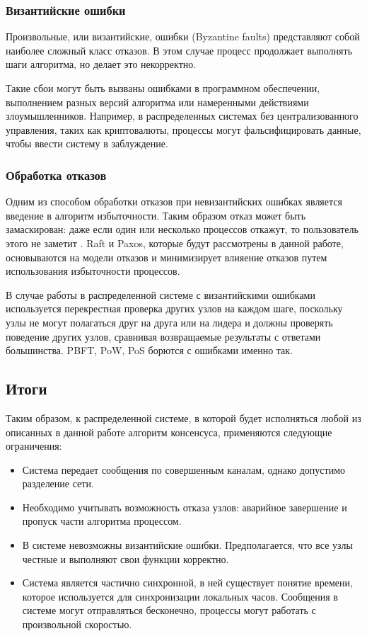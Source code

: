 \subsubsection*{Византийские ошибки}

Произвольные, или византийские, ошибки (Byzantine faults) представляют собой
наиболее сложный класс отказов. В этом случае процесс продолжает выполнять шаги
алгоритма, но делает это некорректно.

Такие сбои могут быть вызваны ошибками в программном обеспечении, выполнением
разных версий алгоритма или намеренными действиями злоумышленников. Например,
в распределенных системах без централизованного управления, таких как
криптовалюты, процессы могут фальсифицировать данные, чтобы ввести систему в
заблуждение.

\subsubsection*{Обработка отказов}

Одним из способом обработки отказов при невизантийских ошибках является введение
в алгоритм избыточности. Таким образом отказ может быть замаскирован: даже если
один или несколько процессов откажут, то пользователь этого не заметит
\cite{christian91}. Raft и Paxos, которые будут рассмотрены в данной работе,
основываются на модели отказов и минимизирует влияение отказов путем
использования избыточности процессов.

В случае работы в распределенной системе с византийскими ошибками используется
перекрестная проверка других узлов на каждом шаге, поскольку узлы не могут
полагаться друг на друга или на лидера и должны проверять поведение других узлов,
сравнивая возвращаемые результаты с ответами большинства. PBFT, PoW, PoS борются
с ошибками именно так.

\subsection{Итоги}

Таким образом, к распределенной системе, в которой будет исполняться любой из
описанных в данной работе алгоритм консенсуса, применяются следующие ограничения:

\begin{itemize}
    \item Система передает сообщения по совершенным каналам, однако допустимо
        разделение сети.
    \item Необходимо учитывать возможность отказа узлов: аварийное завершение и
        пропуск части алгоритма процессом.
    \item В системе невозможны византийские ошибки. Предполагается, что все узлы
        честные и выполняют свои функции корректно.
    \item Система является частично синхронной, в ней существует понятие времени,
        которое используется для синхронизации локальных часов. Сообщения в системе
        могут отправляться бесконечно, процессы могут работать с произвольной
        скоростью.
\end{itemize}
